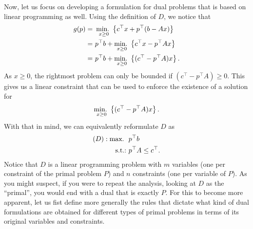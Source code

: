 Now, let us focus on developing a formulation for dual problems that is based on linear programming as well. Using the definition of $D$, we notice that
%
\begin{align*}
	g(p) = \ & \mathop{\text{min.~}}_{x \geq 0}  \left\{ c^\top x + p^\top (b - Ax) \right \}	\\
	= \ & p^\top b + \mathop{\text{min.~}}_{x \geq 0}  \left\{ c^\top x - p^\top Ax \right \}    \\
    = \ & p^\top b + \mathop{\text{min.~}}_{x \geq 0}  \left\{ (c^\top - p^\top A)x \right \}.  
\end{align*} 
%
As $x \ge 0$, the rightmost problem can only be bounded if $(c^\top - p^\top A) \ge 0$. This gives us a linear constraint that can be used to enforce the existence of a solution for 
%
\begin{equation*}
	\mathop{\text{min.~}}_{x \geq 0}  \left\{ (c^\top - p^\top A)x \right \}.
\end{equation*}
%
With that in mind, we can equivalently reformulate $D$ as
%
\begin{align*}
	(D) : \mathop{\text{max.~}} \ & p^\top b \\
	\mathop{\text{s.t.:~}} 	  & p^\top A \leq c^\top.
\end{align*}	
%
Notice that $D$ is a linear programming problem with $m$ variables (one per constraint of the primal problem $P$) and $n$ constraints (one per variable of $P$). As you might suspect, if you were to repeat the analysis, looking at $D$ as the ``primal'', you would end with a dual that is exactly $P$. For this to become more apparent, let us fist define more generally the rules that dictate what kind of dual formulations are obtained for different types of primal problems in terms of its original variables and constraints. 

